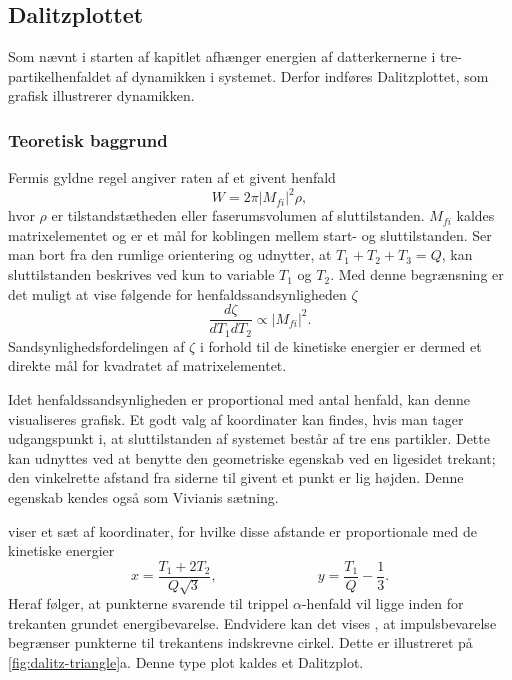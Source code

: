 \subsection{Dalitzplottet}
\label{sec:dalitz}

Som nævnt i starten af kapitlet afhænger energien af datterkernerne i tre-partikelhenfaldet af
dynamikken i systemet. Derfor indføres Dalitzplottet, som grafisk illustrerer dynamikken.

\subsubsection{Teoretisk baggrund}
\label{sec:dalitz-teori}


Fermis gyldne regel angiver raten af et givent henfald \cite[s. 16]{Bettini}
\begin{equation}
  \label{eq:fermi}
  W = 2\pi|M_{fi}|^{2}\rho,
\end{equation}
hvor $\rho$ er tilstandstætheden eller faserumsvolumen af sluttilstanden. $M_{fi}$ kaldes
matrixelementet og er et mål for koblingen mellem start- og sluttilstanden. Ser man bort fra den
rumlige orientering og udnytter, at $T_{1} + T_{2} + T_{3} = Q$, kan sluttilstanden beskrives ved
kun to variable $T_{1}$ og $T_{2}$. Med denne begrænsning er det muligt at vise følgende for
henfaldssandsynligheden $\zeta$ \cite{Kallen}
\begin{equation}
  \label{eq:DOS}
  \frac{d\zeta}{dT_{1}dT_{2}} \propto |M_{fi}|^{2}.
\end{equation}
Sandsynlighedsfordelingen af $\zeta$ i forhold til de kinetiske energier er dermed et direkte mål for
kvadratet af matrixelementet. 

Idet henfaldssandsynligheden er proportional med antal henfald, kan denne visualiseres grafisk. Et
godt valg af koordinater kan findes, hvis man tager udgangspunkt i, at sluttilstanden af systemet
består af tre ens partikler. Dette kan udnyttes ved at benytte den geometriske egenskab ved en
ligesidet trekant; den vinkelrette afstand fra siderne til givent et punkt er lig højden. Denne
egenskab kendes også som Vivianis sætning.

 viser et sæt af koordinater, for hvilke disse afstande er proportionale med de
kinetiske energier
\begin{equation}
  \label{eq:dalitz}
  x = \frac{T_{1}+2T_{2}}{Q\sqrt{3}}, \hspace{3cm} y = \frac{T_{1}}{Q} - \frac{1}{3}.
\end{equation}
Heraf følger, at punkterne svarende til trippel $\alpha$-henfald vil ligge inden for trekanten grundet
energibevarelse. Endvidere kan det vises \cite{dalitz}, at impulsbevarelse begrænser punkterne til
trekantens indskrevne cirkel. Dette er illustreret på \cref{fig:dalitz-triangle}a. Denne type plot
kaldes et Dalitzplot.

